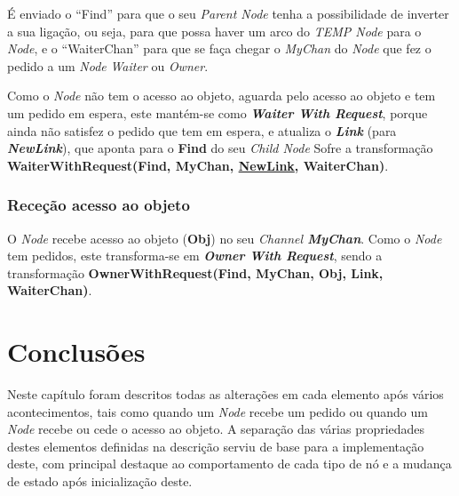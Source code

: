 É enviado o ``Find'' para que o seu \emph{Parent Node} tenha a possibilidade de inverter a sua ligação, ou seja, para que possa haver um arco do \emph{TEMP Node} para o \emph{Node}, 
e o ``WaiterChan'' para que se faça chegar o \emph{MyChan} do \emph{Node} que fez o pedido a um \emph{Node} \emph{Waiter} ou \emph{Owner}.

Como o \emph{Node} não tem o acesso ao objeto, aguarda pelo acesso ao objeto e tem um pedido em espera, este mantém-se como \emph{\textbf{Waiter With Request}},
porque ainda não satisfez o pedido que tem em espera, 
e atualiza o \textbf{\emph{Link}} (para \textbf{\emph{NewLink}}), que aponta para o \textbf{Find} do seu \emph{Child Node}
Sofre a transformação \textbf{WaiterWithRequest(Find, MyChan, \underline{NewLink}, WaiterChan)}.


\subsubsection*{Receção acesso ao objeto}
O \emph{Node} recebe acesso ao objeto (\textbf{Obj}) no seu \emph{Channel \textbf{MyChan}}.
Como o \emph{Node} tem pedidos, este transforma-se em \textbf{\emph{Owner With Request}}, sendo a transformação \textbf{OwnerWithRequest(Find, MyChan, Obj, Link, WaiterChan)}.


\section{Conclusões}
Neste capítulo foram descritos todas as alterações em cada elemento após vários acontecimentos, tais como quando um \emph{Node} recebe um pedido ou quando um \emph{Node} recebe ou cede o acesso ao objeto.
A separação das várias propriedades destes elementos definidas na descrição serviu de base para a implementação deste, com principal destaque ao comportamento de cada tipo de nó e a mudança de estado após inicialização deste.  

